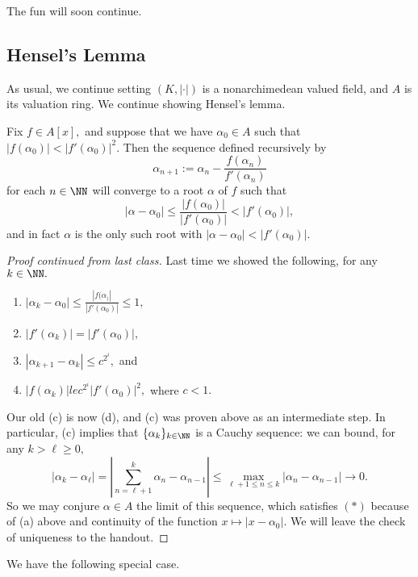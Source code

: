 \documentclass[../notes.tex]{subfiles}
\begin{document}















The fun will soon continue.

\subsection{Hensel's Lemma}
As usual, we continue setting $(K,|\cdot|)$ is a nonarchimedean valued field, and $A$ is its valuation ring. We continue showing Hensel's lemma.
\begin{lemma}[Hensel]
	Fix $f\in A[x],$ and suppose that we have $\alpha_0\in A$ such that $|f(\alpha_0)|<|f'(\alpha_0)|^2.$ Then the sequence defined recursively by
	\[\alpha_{n+1}:=\alpha_n-\frac{f(\alpha_n)}{f'(\alpha_n)}\]
	for each $n\in\NN$ will converge to a root $\alpha$ of $f$ such that
	\[|\alpha-\alpha_0|\le\frac{|f(\alpha_0)|}{|f'(\alpha_0)|}<|f'(\alpha_0)|,\]
	and in fact $\alpha$ is the only such root with $|\alpha-\alpha_0|<|f'(\alpha_0)|.$
\end{lemma}
\begin{proof}[Proof continued from last class]
	Last time we showed the following, for any $k\in\NN.$
	\begin{enumerate}[label=(\alph*)]
		\item $|\alpha_k-\alpha_0|\le\frac{|f(\alpha_)|}{|f'(\alpha_0)|}\le1,$
		\item $|f'(\alpha_k)|=|f'(\alpha_0)|,$
		\item $|\alpha_{k+1}-\alpha_k|\le c^{2^{i}},$ and
		\item $|f(\alpha_k)|le c^{2^i}|f'(\alpha_0)|^2,$ where $c<1.$
	\end{enumerate}
	Our old (c) is now (d), and (c) was proven above as an intermediate step. In particular, (c) implies that $\{\alpha_k\}_{k\in\NN}$ is a Cauchy sequence: we can bound, for any $k>\ell\ge0,$
	\[|\alpha_k-\alpha_\ell|=\left|\sum_{n=\ell+1}^k\alpha_n-\alpha_{n-1}\right|\le\max_{\ell+1\le n\le k}|\alpha_n-\alpha_{n-1}|\to0.\]
	So we may conjure $\alpha\in A$ the limit of this sequence, which satisfies $(*)$ because of (a) above and continuity of the function $x\mapsto|x-\alpha_0|.$ We will leave the check of uniqueness to the handout.
\end{proof}
We have the following special case.
\end{document}
